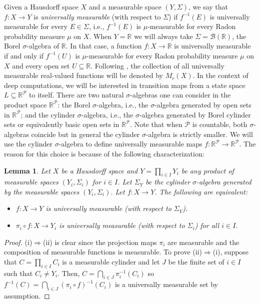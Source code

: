 \documentclass[psamsfonts]{amsart}
\newtheorem{lem}[thm]{Lemma}
\theoremstyle{definition}
\theoremstyle{remark}
\numberwithin{equation}{section}
\begin{document}
Given a Hausdorff space $X$ and a measurable space $(Y,\Sigma)$, we say that $f:X\rightarrow Y$ is \emph{universally measurable} (with respect to $\Sigma$) if $f^{-1}(E)$ is universally measurable for every $E\in\Sigma$, i.e., $f^{-1}(E)$ is $\mu$-measurable for every Radon probability measure $\mu$ on $X$. When $Y=\mathbb{R}$ we will always take $\Sigma=\mathcal{B}(\mathbb{R})$, the Borel $\sigma$-algebra of $\mathbb{R}$. In that case, a function $f:X\rightarrow\mathbb{R}$ is universally measurable if and only if $f^{-1}(U)$ is $\mu$-measurable for every Radon probability measure $\mu$ on $X$ and every open set $U\subseteq\mathbb{R}$. Following \cite{BFT_1978_PCompactBaire}, the collection of all universally measurable real-valued functions will be denoted by $M_r(X)$. In the context of deep computations, we will be interested in transition maps from a state space $L\subseteq \mathbb{R}^\mathcal{P}$ to itself. There are two natural $\sigma$-algebras one can consider in the product space $\mathbb{R}^\mathcal{P}$: the Borel $\sigma$-algebra, i.e., the $\sigma$-algebra generated by open sets in $\mathbb{R}^\mathcal{P}$; and the cylinder $\sigma$-algebra, i.e., the $\sigma$-algebra generated by Borel cylinder sets or equivalently basic open sets in $\mathbb{R}^\mathcal{P}$. Note that when $\mathcal{P}$ is countable, both $\sigma$-algebras coincide but in general the cylinder $\sigma$-algebra is strictly smaller. We will use the cylinder $\sigma$-algebra to define universally measurable maps $f:\mathbb{R}^\mathcal{P}\rightarrow\mathbb{R}^\mathcal{P}$. The reason for this choice is because of the following characterization:

\begin{lem}\label{lemma:coordinated_univ_meas}
    Let $X$ be a Hausdorff space and $Y=\prod_{i\in I}Y_i$ be any product of measurable spaces $(Y_i,\Sigma_i)$ for $i\in I$. Let $\Sigma_Y$ be the cylinder $\sigma$-algebra generated by the measurable spaces $(Y_i,\Sigma_i)$. Let $f:X\rightarrow Y$. The following are equivalent:
    \begin{itemize}
        \item [(i)] $f:X\rightarrow Y$ is universally measurable (with respect to $\Sigma_Y$).
        \item [(ii)] $\pi_i\circ f:X\rightarrow Y_i$ is universally measurable (with respect to $\Sigma_i$) for all $i\in I$.
    \end{itemize}
\end{lem}

\begin{proof}
    (i)$\Rightarrow$(ii) is clear since the projection maps $\pi_i$ are measurable and the composition of measurable functions is measurable. To prove (ii)$\Rightarrow$(i), suppose that $C=\prod_{i\in I}C_i$ is a measurable cylinder and let $J$ be the finite set of $i\in I$ such that $C_i\neq Y_i$. Then, $C=\bigcap_{i\in J}\pi_i^{-1}(C_i)$ so $f^{-1}(C)=\bigcap_{i\in J}(\pi_i\circ f)^{-1}(C_i)$ is a universally measurable set by assumption.
\end{proof}
\end{document}
